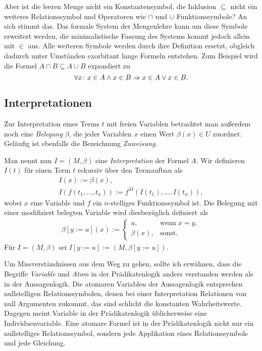 Aber ist die leeren Menge nicht ein Konstantensymbol, die Inklusion
${\subseteq}$ nicht ein weiteres Relationssymbol und Operatoren wie
$\cap$ und $\cup$ Funktionssymbole? An sich stimmt das. Das
formale System der Mengenlehre kann um diese Symbole erweitert werden,
die minimalistische Fassung des Systems kommt jedoch allein mit
${\in}$ aus. Alle weiteren Symbole werden durch ihre Definition
ersetzt, obgleich dadurch unter Umständen exorbitant lange Formeln
entstehen. Zum Beispiel wird die Formel $A\cap B\subseteq A\cup B$
expandiert zu
\[\forall x\colon x\in A\land x\in B\Rightarrow x\in A\lor x\in B.\]

\subsection{Interpretationen}

Zur Interpretation eines Terms $t$ mit freien Variablen betrachtet
man außerdem noch eine \emph{Belegung} $\beta$, die jeder Variablen $x$
einen Wert $\beta(x)\in U$ zuordnet. Geläufig ist ebenfalls die
Bezeichnung \emph{Zuweisung}.

Man nennt nun $I=(M,\beta)$ eine \emph{Interpretation} der Formel $A$.
Wir definieren $I(t)$ für einen Term $t$ rekursiv über den Termaufbau
als%
\begin{gather*}
I(x) := \beta(x),\\
I(f(t_1,\ldots,t_n)) := f^M(I(t_1),\ldots,I(t_n)),
\end{gather*}
wobei $x$ eine Variable und $f$ ein $n$-stelliges Funktionssymbol
ist. Die Belegung mit einer modifiziert belegten Variable wird
diesbezüglich definiert als%
\begin{gather*}
\beta[y{:=}u](x) := \begin{cases}
u, & \text{wenn}\;x=y,\\
\beta(x), & \text{sonst}.
\end{cases}
\end{gather*}
Für $I=(M,\beta)$ sei $I[y{:=}u] := (M,\beta[y{:=}u])$.

Um Missverständnissen aus dem Weg zu gehen, sollte ich erwähnen, dass
die Begriffe \emph{Variable} und \emph{Atom} in der Prädikatenlogik
anders verstanden werden als in der Aussagenlogik. Die atomaren
Variablen der Aussagenlogik entsprechen nullstelligen Relationssymbolen,
denen bei einer Interpretation Relationen von null Argumenten zukommt,
das sind schlicht die konstanten Wahrheitswerte. Dagegen meint Variable
in der Prädikatenlogik üblicherweise eine Individuenvariable. Eine
atomare Formel ist in der Prädikatenlogik nicht nur ein nullstelliges
Relationssymbol, sondern jede Applikation eines Relationssymbols und
jede Gleichung.

